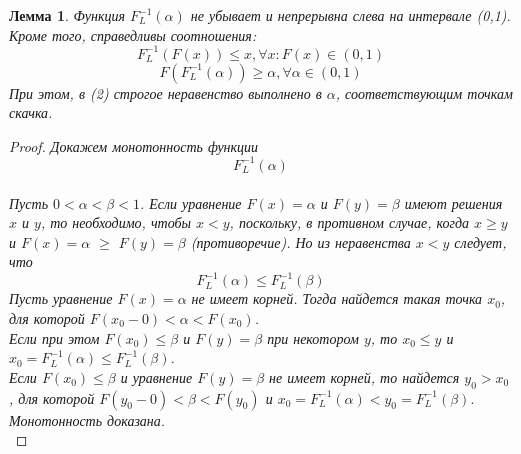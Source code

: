 \documentclass[18pt,a4paper]{article}
\theoremstyle{plain}
\newtheorem{Lemma}{Лемма}[section]
\theoremstyle{definition}
\begin{document}
\begin{Lemma} \label{main} Функция $F^{-1}_{L}(\alpha)$ не убывает и непрерывна слева на интервале (0,1). Кроме того, справедливы соотношения:
\begin{equation}
F^{-1}_{L}(F(x))\le x,  \forall x: F(x) \in (0,1)
\end{equation}
\begin{equation}
F(F^{-1}_{L}(\alpha)) \ge \alpha,  \forall \alpha \in (0,1)
\end{equation}
При этом, в (2) строгое неравенство выполнено в $\alpha$, соответствующим точкам скачка.
\end{Lemma}

\begin{proof}
\it Докажем монотонность функции $$F^{-1}_{L}(\alpha)$$\rm\\
Пусть $0 < \alpha < \beta < 1$. Если уравнение $F(x) = \alpha$ и $F(y) = \beta$ имеют решения $x$ и $y$, то необходимо, чтобы $x<y$, поскольку, в противном случае, когда $x\ge y$
и $F(x) = \alpha$ $\ge$ $F(y) = \beta$ (противоречие). Но из неравенства $x<y$ следует, что
$$
F^{-1}_{L}(\alpha)\le F^{-1}_{L}(\beta)
$$
Пусть уравнение $F(x) = \alpha$  не имеет корней. Тогда найдется такая точка $x_0$, для которой $F(x_0 -0) < \alpha < F(x_0)$. \\
Если при этом $F(x_0) \le \beta$ и $F(y) = \beta$ при некотором $y$, то $x_0 \le y$ и $x_0 = F^{-1}_{L}(\alpha) \le  F^{-1}_{L}(\beta) $.\\
Если $F(x_0) \le \beta$ и уравнение $F(y) = \beta$ не имеет корней, то найдется $y_0 > x_0$, для которой $F(y_0-0)<\beta<F(y_0)$ и $x_0 = F^{-1}_{L}(\alpha) < y_0 = F^{-1}_{L}(\beta).$\\
Монотонность доказана.\\


\end{proof}
\end{document}
